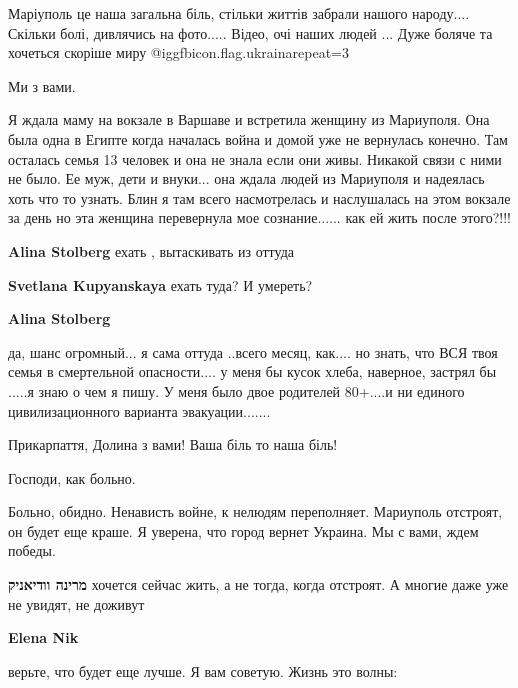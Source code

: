 \begin{itemize}

Маріуполь це наша загальна біль, стільки життів забрали нашого народу....
Скільки болі, дивлячись на фото..... Відео, очі наших людей ... Дуже боляче та
хочеться скоріше миру @igg{fbicon.flag.ukraina}{repeat=3}

Ми з вами.


Я ждала маму на вокзале в Варшаве и встретила женщину из Мариуполя. Она была
одна в Египте когда началась война и домой уже не вернулась конечно. Там
осталась семья 13 человек и она не знала если они живы. Никакой связи с ними не
было. Ее муж, дети и внуки... она ждала людей из Мариуполя и надеялась хоть что то
узнать. Блин я там всего насмотрелась и наслушалась на этом вокзале за день но
эта женщина перевернула мое сознание...... как ей жить после этого?!!!

\begin{itemize} %
\textbf{Alina Stolberg} ехать , вытаскивать из оттуда

\textbf{Svetlana Kupyanskaya} ехать туда? И умереть?

\textbf{Alina Stolberg} 

да, шанс огромный... я сама оттуда ..всего месяц, как.... но знать, что ВСЯ твоя
семья в смертельной опасности.... у меня бы кусок хлеба, наверное, застрял бы
.....я знаю о чем я пишу. У меня было двое родителей 80+....и ни единого
цивилизационного варианта эвакуации.......

\end{itemize} %

Прикарпаття, Долина з вами!
Ваша біль то наша біль!

Господи, как больно.


Больно, обидно. Ненависть войне, к нелюдям переполняет. Мариуполь отстроят, он
будет еще краше. Я уверена, что город вернет Украина. Мы с вами, ждем победы.

\begin{itemize} %
\textbf{מרינה וודיאניק} хочется сейчас жить, а не тогда, когда отстроят. А многие даже уже не увидят, не доживут

\textbf{Elena Nik} 

верьте, что будет еще лучше. Я вам советую. Жизнь это волны:


\end{itemize}
\end{itemize}
